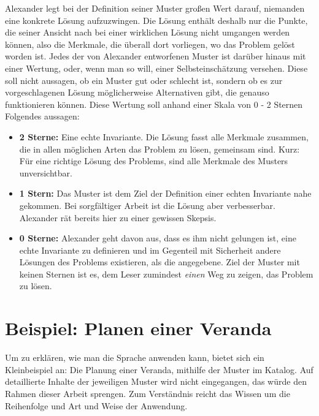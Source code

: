 \documentclass[fontsize=11pt,a4paper,final]{scrreprt}[2003/01/01]
\begin{document}
Alexander legt bei der Definition seiner Muster großen Wert darauf, niemanden eine konkrete Lösung aufzuzwingen. Die Lösung enthält deshalb nur die Punkte, die seiner Ansicht nach bei einer wirklichen Lösung nicht umgangen werden können, also die Merkmale, die überall dort vorliegen, wo das Problem gelöst worden ist. Jedes der von Alexander entworfenen Muster ist darüber hinaus mit einer Wertung, oder, wenn man so will, einer  Selbsteinschätzung versehen. Diese soll nicht aussagen, ob ein Muster gut oder schlecht ist, sondern ob es zur vorgeschlagenen Lösung möglicherweise Alternativen gibt, die genauso funktionieren können. Diese Wertung soll anhand einer Skala von 0 - 2 Sternen Folgendes aussagen:
\begin{itemize}
	\item \textbf{2 Sterne:} Eine echte Invariante. Die Lösung fasst alle Merkmale zusammen, die in allen möglichen Arten das Problem zu lösen, gemeinsam sind. Kurz: Für eine richtige Lösung des Problems, sind alle Merkmale des Musters unversichtbar.
	\item \textbf{1 Stern:} Das Muster ist dem Ziel der Definition einer echten Invariante nahe gekommen. Bei sorgfältiger Arbeit ist die Lösung aber verbesserbar. Alexander rät bereits hier zu einer gewissen Skepsis.
	\item \textbf{0 Sterne:} Alexander geht davon aus, dass es ihm nicht gelungen ist, eine echte Invariante zu definieren und im Gegenteil mit Sicherheit andere Lösungen des Problems existieren, als die angegebene. Ziel der Muster mit keinen Sternen ist es, dem Leser zumindest \textit{einen} Weg zu zeigen, das Problem zu lösen.
\end{itemize}

\section{Beispiel: Planen einer Veranda}
Um zu erklären, wie man die Sprache anwenden kann, bietet sich ein Kleinbeispiel an: Die Planung einer Veranda, mithilfe der Muster im Katalog. Auf detaillierte Inhalte der jeweiligen Muster wird nicht eingegangen, das würde den Rahmen dieser Arbeit sprengen. Zum Verständnis reicht das Wissen um die Reihenfolge und Art und Weise der Anwendung. \\ \\
\end{document}
